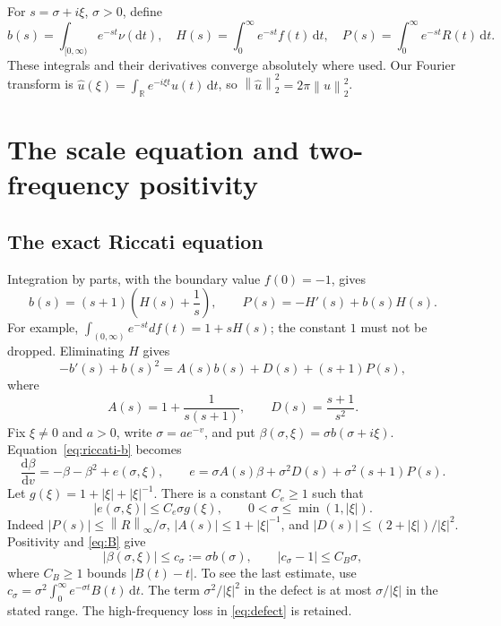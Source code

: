 \documentclass[11pt,letterpaper]{article}
\numberwithin{equation}{section}
\theoremstyle{definition}
\theoremstyle{remark}
\newcommand{\R}{\mathbb R}
\newcommand{\dd}{\,\mathrm d}
\newcommand{\norm}[1]{\left\lVert#1\right\rVert}
\begin{document}
For $s=\sigma+i\xi$, $\sigma>0$, define
\begin{equation}\label{eq:transforms}
 b(s)=\int_{[0,\infty)}e^{-st}\nu(\mathrm dt),\quad
 H(s)=\int_0^\infty e^{-st}f(t)\dd t,\quad
 P(s)=\int_0^\infty e^{-st}R(t)\dd t.
\end{equation}
These integrals and their derivatives converge absolutely where used. Our
Fourier transform is $\widehat u(\xi)=\int_\R e^{-i\xi t}u(t)\dd t$, so
$\norm{\widehat u}_2^2=2\pi\norm u_2^2$.

\section{The scale equation and two-frequency positivity}\label{sec:scale}

\subsection{The exact Riccati equation}
Integration by parts, with the boundary value $f(0)=-1$, gives
\begin{equation}\label{eq:BH}
 b(s)=(s+1)\left(H(s)+\frac1s\right),\qquad
 P(s)=-H'(s)+b(s)H(s).
\end{equation}
For example, $\int_{(0,\infty)}e^{-st}df(t)=1+sH(s)$; the constant $1$
must not be dropped. Eliminating $H$ gives
\begin{equation}\label{eq:riccati-b}
 -b'(s)+b(s)^2=A(s)b(s)+D(s)+(s+1)P(s),
\end{equation}
where
\[
 A(s)=1+\frac1{s(s+1)},\qquad D(s)=\frac{s+1}{s^2}.
\]
Fix $\xi\ne0$ and $a>0$, write $\sigma=a e^{-v}$, and put
$\beta(\sigma,\xi)=\sigma b(\sigma+i\xi)$. Equation~\eqref{eq:riccati-b}
becomes
\begin{equation}\label{eq:riccati-beta}
 \frac{\mathrm d\beta}{\mathrm dv}=-\beta-\beta^2+e(\sigma,\xi),\qquad
 e=\sigma A(s)\beta+\sigma^2D(s)+\sigma^2(s+1)P(s).
\end{equation}
Let $g(\xi)=1+|\xi|+|\xi|^{-1}$. There is a constant $C_e\ge1$ such that
\begin{equation}\label{eq:defect}
 |e(\sigma,\xi)|\le C_e\sigma g(\xi),
 \qquad 0<\sigma\le\min(1,|\xi|).
\end{equation}
Indeed $|P(s)|\le\norm R_\infty/\sigma$,
$|A(s)|\le1+|\xi|^{-1}$, and
$|D(s)|\le(2+|\xi|)/|\xi|^2$. Positivity and \eqref{eq:B} give
\begin{equation}\label{eq:csigma}
 |\beta(\sigma,\xi)|\le c_\sigma:=\sigma b(\sigma),\qquad
 |c_\sigma-1|\le C_B\sigma,
\end{equation}
where $C_B\ge1$ bounds $|B(t)-t|$. To see the last estimate, use
$c_\sigma=\sigma^2\int_0^\infty e^{-\sigma t}B(t)\dd t$.
The term $\sigma^2/|\xi|^2$ in the defect is at most $\sigma/|\xi|$ in
the stated range. The high-frequency loss in \eqref{eq:defect} is retained.
\end{document}
